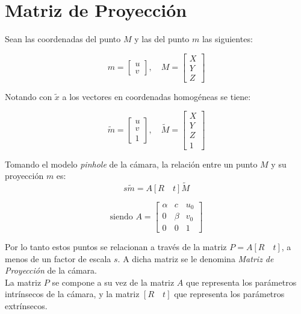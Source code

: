\section{Matriz de Proyección}
\label{matriz_de_proyeccion}

Sean las coordenadas del punto  $M$ y las del punto $m$ las siguientes:


\[m = \begin{bmatrix}
u \\ 
v
\end{bmatrix} , \quad
M = \begin{bmatrix}
X \\ 
Y \\
Z
\end{bmatrix} \]

Notando con $\tilde{x}$ a los vectores en coordenadas homogéneas se tiene:


\[\tilde{m} = \begin{bmatrix}
u \\ 
v \\
1
\end{bmatrix} , \quad
\tilde{M} = \begin{bmatrix}
X \\ 
Y \\
Z \\
1
\end{bmatrix} \]

Tomando el modelo \textit{pinhole} de la cámara, la relación entre un punto $M$ y su proyección $m$ es:
\begin{equation}
s\tilde{m} = A [R \quad t]\tilde{M}
\label{proyeccion}
\end{equation}




\begin{equation}
\text{siendo }
A = \begin{bmatrix}
\alpha & c & u_0 \\ 
0 & \beta & v_0 \\ 
0 & 0 & 1
\end{bmatrix} 
\end{equation}

Por lo tanto estos puntos se relacionan a través de la matriz $P = A [R \quad t]$, a menos de un factor de escala $s$. A dicha matriz  se le denomina \emph{Matriz de Proyección} de la cámara.\\

La matriz $P$ se compone a su vez de la matriz $A$ que representa los parámetros intrínsecos de la cámara, y la matriz $[R \quad t]$ que representa los parámetros extrínsecos.\\

